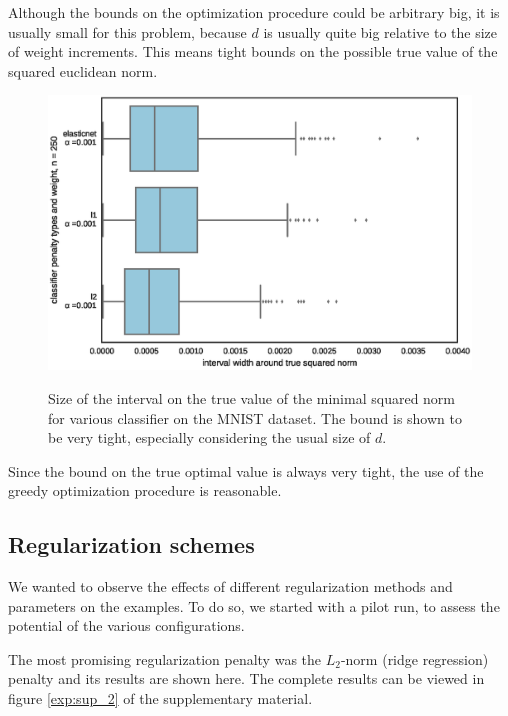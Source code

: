 \documentclass{article} %
\begin{document}
Although the bounds on the optimization procedure could be arbitrary big, it
is usually small for this problem, because $d$ is usually quite big relative
to the size of weight increments. This means tight bounds on the possible
true value of the squared euclidean norm.

\begin{figure}[h!]
\begin{center}
\includegraphics[scale=0.65]{figs/experiment_1}
\label{res:exp1}
\caption{\small Size of the interval on the true value of the minimal squared norm for various
                classifier on the MNIST dataset. The bound is shown to be very tight, especially considering the usual size of $d$.}
\end{center}
\end{figure}

Since the bound on the true optimal value is always very tight, the use of
the greedy optimization procedure is reasonable.


\subsection{Regularization schemes}

We wanted to observe the effects of different regularization methods and parameters on the examples. To do so, we started with
a pilot run, to assess the potential of the various configurations.

The most promising regularization penalty was the $L_2$-norm (ridge
regression) penalty and its results are shown here. 
The complete results can be viewed in figure \ref{exp:sup_2} of the supplementary material.
\end{document}
